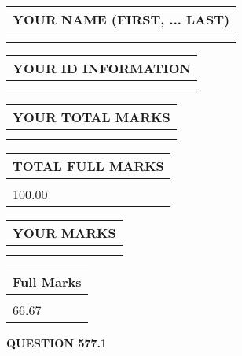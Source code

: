 \documentclass{ctexart}
\begin{document}
   
   
   
\newpage 
\setcounter{page}{ 
   577001 } 
   
   
   
   
\noindent\begin{tabular}{|l|}
\hline
YOUR NAME (FIRST, ... LAST)  \\
\hline
 \\ 
 \\ 
\hline
\end{tabular}
\hspace{0.05in} \begin{tabular}{|l|}
\hline
 YOUR   ID   INFORMATION  \\
\hline
 \\ 
 \\ 
\hline
\end{tabular}
   
   
\vspace{0.2in}\noindent\begin{tabular}{|l|}
\hline
YOUR TOTAL MARKS  \\
\hline
 \\ 
 \\ 
\hline
\end{tabular}
\hspace{0.05in} \begin{tabular}{|l|}
\hline
TOTAL FULL MARKS  \\
\hline
 \\ 
100.00 \\
\hline
\end{tabular}
   
   
 \vspace{0.2in}
 
 
 
 
   
   
  
\vspace{0.2in}
  
\noindent\begin{tabular}{|l|}
\hline
 YOUR MARKS  \\
\hline
 \\ 
 \\ 
\hline
\end{tabular}
\hspace{0.05in} \begin{tabular}{|l|}
\hline
 Full Marks  \\
\hline
 \\ 
66.67 \\
\hline
\end{tabular}
{\textbf{\Large{QUESTION
577.1 
}}}
  
\end{document}
